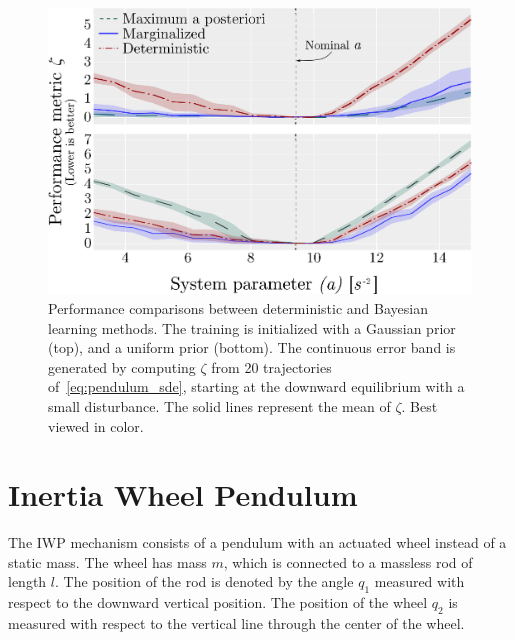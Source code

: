\begin{figure}[tb]
    \centering
    \includegraphics[width=0.7\linewidth]{figures/H_combined.eps}
    \caption{
        Performance comparisons between deterministic and Bayesian learning
        methods. 
        The training is initialized with a Gaussian prior (top), and a
        uniform prior (bottom). 
        The continuous error band is generated by computing $\zeta$ from 20
        trajectories of~\eqref{eq:pendulum_sde}, starting at the downward
        equilibrium with a small disturbance. 
        The solid lines represent the mean of $\zeta$. 
        Best viewed in color.
    }
    \label{fig:bayes_compare}
\end{figure}

\section{Inertia Wheel Pendulum}
\label{sec:iwp}

The IWP mechanism consists of a pendulum with an actuated wheel instead of a static
mass.
%
The wheel has mass $m$, which is connected to a massless rod of length \(l\). 
%
The position of the rod is denoted by the angle \(q_1\) measured with
respect to the downward vertical position.
%
The position of the wheel \(q_2\) is measured with respect to the vertical
line through the center of the wheel.

